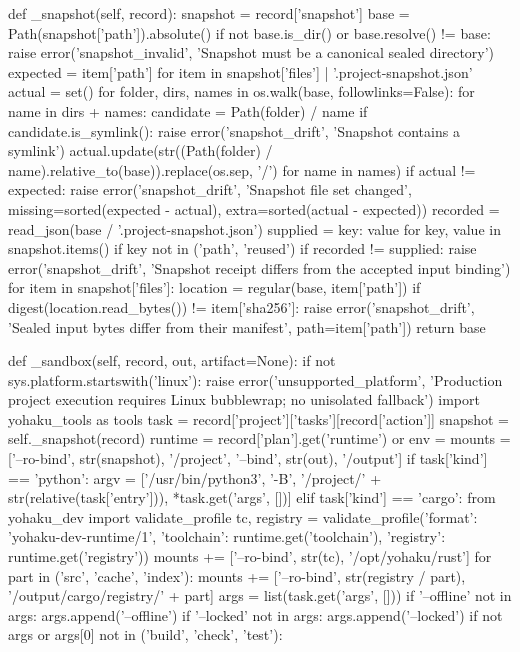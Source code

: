     def _snapshot(self, record):
        snapshot = record['snapshot']
        base = Path(snapshot['path']).absolute()
        if not base.is_dir() or base.resolve() != base:
            raise error('snapshot_invalid', 'Snapshot must be a canonical sealed directory')
        expected = {item['path'] for item in snapshot['files']} | {'.project-snapshot.json'}
        actual = set()
        for folder, dirs, names in os.walk(base, followlinks=False):
            for name in dirs + names:
                candidate = Path(folder) / name
                if candidate.is_symlink():
                    raise error('snapshot_drift', 'Snapshot contains a symlink')
            actual.update(str((Path(folder) / name).relative_to(base)).replace(os.sep, '/') for name in names)
        if actual != expected:
            raise error('snapshot_drift', 'Snapshot file set changed', missing=sorted(expected - actual), extra=sorted(actual - expected))
        recorded = read_json(base / '.project-snapshot.json')
        supplied = {key: value for key, value in snapshot.items() if key not in ('path', 'reused')}
        if recorded != supplied:
            raise error('snapshot_drift', 'Snapshot receipt differs from the accepted input binding')
        for item in snapshot['files']:
            location = regular(base, item['path'])
            if digest(location.read_bytes()) != item['sha256']:
                raise error('snapshot_drift', 'Sealed input bytes differ from their manifest', path=item['path'])
        return base

    def _sandbox(self, record, out, artifact=None):
        if not sys.platform.startswith('linux'):
            raise error('unsupported_platform', 'Production project execution requires Linux bubblewrap; no unisolated fallback')
        import yohaku_tools as tools
        task = record['project']['tasks'][record['action']]
        snapshot = self._snapshot(record)
        runtime = record['plan'].get('runtime') or {}
        env = {}
        mounts = ['--ro-bind', str(snapshot), '/project', '--bind', str(out), '/output']
        if task['kind'] == 'python':
            argv = ['/usr/bin/python3', '-B', '/project/' + str(relative(task['entry'])), *task.get('args', [])]
        elif task['kind'] == 'cargo':
            from yohaku_dev import validate_profile
            tc, registry = validate_profile({'format': 'yohaku-dev-runtime/1',
                                             'toolchain': runtime.get('toolchain'), 'registry': runtime.get('registry')})
            mounts += ['--ro-bind', str(tc), '/opt/yohaku/rust']
            for part in ('src', 'cache', 'index'):
                mounts += ['--ro-bind', str(registry / part), '/output/cargo/registry/' + part]
            args = list(task.get('args', []))
            if '--offline' not in args:
                args.append('--offline')
            if '--locked' not in args:
                args.append('--locked')
            if not args or args[0] not in ('build', 'check', 'test'):

